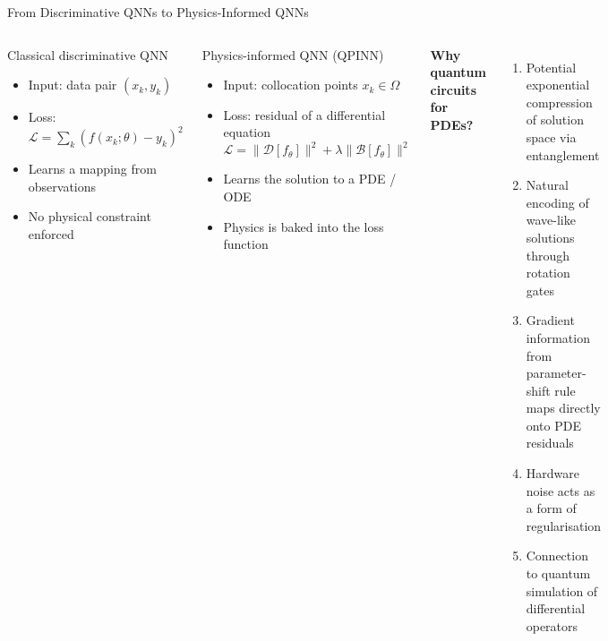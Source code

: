\documentclass[aspectratio=169,10pt]{beamer}
\begin{document}
\begin{frame}{From Discriminative QNNs to Physics-Informed QNNs}
  \begin{columns}[T]
      \begin{block}{Classical discriminative QNN}
        \begin{itemize}
          \item Input: data pair $(x_k, y_k)$
          \item Loss: $\mathcal{L}=\sum_k(f(x_k;\theta)-y_k)^2$
          \item Learns a mapping from observations
          \item No physical constraint enforced
        \end{itemize}
      \end{block}
      \vspace{0.3cm}
      \begin{alertblock}{Physics-informed QNN (QPINN)}
        \begin{itemize}
          \item Input: collocation points $x_k\in\Omega$
          \item Loss: residual of a differential equation
            \[
              \mathcal{L}=\|\mathcal{D}[f_\theta]\|^2
                         +\lambda\|\mathcal{B}[f_\theta]\|^2
            \]
          \item Learns the solution to a PDE / ODE
          \item Physics is baked into the loss function
        \end{itemize}
      \end{alertblock}
      \textbf{Why quantum circuits for PDEs?}
      \begin{enumerate}\itemsep4pt
        \item Potential exponential compression of solution
              space via entanglement
        \item Natural encoding of wave-like solutions
              through rotation gates
        \item Gradient information from parameter-shift rule
              maps directly onto PDE residuals
        \item Hardware noise acts as a form of regularisation
        \item Connection to quantum simulation of
              differential operators
      \end{enumerate}
  \end{columns}
\end{frame}
\end{document}
